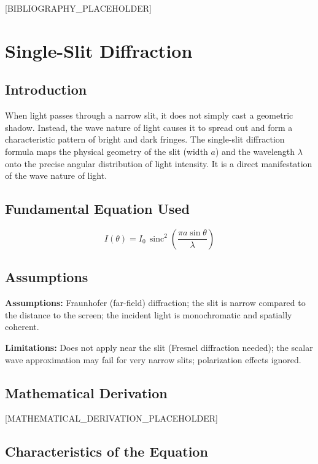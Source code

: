 \documentclass[11pt,openright]{book}
\begin{document}
[BIBLIOGRAPHY_PLACEHOLDER]


\chapter{Single-Slit Diffraction}

\section*{Introduction}

When light passes through a narrow slit, it does not simply cast a geometric shadow. Instead, the wave nature of light causes it to spread out and form a characteristic pattern of bright and dark fringes. The single-slit diffraction formula maps the physical geometry of the slit (width $a$) and the wavelength $\lambda$ onto the precise angular distribution of light intensity. It is a direct manifestation of the wave nature of light.
\section*{Fundamental Equation Used}

\begin{equation}
I(\theta) = I_0\,\operatorname{sinc}^2\!\left(\frac{\pi a \sin\theta}{\lambda}\right)
\end{equation}
\section*{Assumptions}

\textbf{Assumptions:} Fraunhofer (far-field) diffraction; the slit is narrow compared to the distance to the screen; the incident light is monochromatic and spatially coherent.


\textbf{Limitations:} Does not apply near the slit (Fresnel diffraction needed); the scalar wave approximation may fail for very narrow slits; polarization effects ignored.


\section*{Mathematical Derivation}

[MATHEMATICAL_DERIVATION_PLACEHOLDER]

\section*{Characteristics of the Equation}
\end{document}
